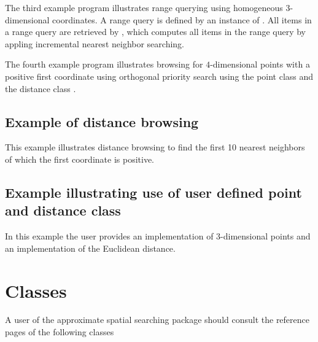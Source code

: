 The third example program illustrates range querying using homogeneous 3-dimensional coordinates. 
A range query is defined by an instance of . 
All items in a range query are retrieved by 
, which computes all items in
the range query by appling incremental nearest neighbor searching. 


The fourth example program illustrates browsing for $4$-dimensional points with
a positive first coordinate using orthogonal priority search
using the point class 
and the distance class .
 
\subsection{Example of distance browsing}


This example illustrates distance browsing to find the first 10 nearest neighbors of which
the first coordinate is positive. 

\subsection{Example illustrating use of user defined point and distance class}

In this example the user provides an implementation of 3-dimensional points and an
implementation of the Euclidean distance.


\section{Classes}

A user of the approximate spatial searching package should consult the reference
pages of the following classes

